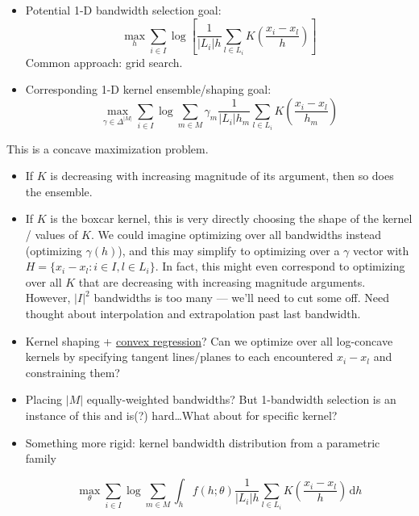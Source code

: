 \documentclass{article}
\begin{document}
\begin{itemize}
\item 
Potential 1-D bandwidth selection goal:
\[\max_h \sum_{i\in I} \log \left[ \frac{1}{\left|L_i\right| h}
    \sum_{l\in L_i} K\left(\frac{x_i-x_l}{h}\right) \right] \]
Common approach: grid search.
\item
Corresponding 1-D kernel ensemble/shaping goal:
\[\max_{\gamma\in\Delta^{\left|M\right|}} \sum_{i\in I} \log \sum_{m\in M} \gamma_m \frac{1}{\left|L_i\right| h_m}
    \sum_{l\in L_i} K\left(\frac{x_i-x_l}{h_m}\right) \]
\end{itemize}
This is a concave maximization problem.
%
\begin{itemize}
\item

  If $K$ is decreasing with increasing magnitude of its argument, then so does
  the ensemble.

\item

  If $K$ is the boxcar kernel, this is very directly choosing the shape of the
  kernel / values of $K$.
  We could imagine optimizing over all bandwidths instead (optimizing
  $\gamma(h)$), and this may simplify to optimizing over a $\gamma$ vector with
  $H=\{x_i-x_l:i\in I, l\in L_i\}$.
  In fact, this might even correspond to optimizing over all $K$ that are
  decreasing with increasing magnitude arguments.
  However, $\left|I\right|^2$ bandwidths is too many --- we'll need to cut some off.
  Need thought about interpolation and extrapolation past last bandwidth.

\item

  Kernel shaping +
  \href{http://www.stat.columbia.edu/~bodhi/Talks/NPCvxReg.pdf}{convex
    regression}? Can we optimize over all log-concave kernels by specifying
  tangent lines/planes to each encountered $x_i-x_l$ and constraining them?
\item

  Placing $\left|M\right|$ equally-weighted bandwidths? But 1-bandwidth
  selection is an instance of this and is(?) hard\ldots What about for specific
  kernel?

\item

  Something more rigid: kernel bandwidth distribution from a parametric family

  \[\max_\theta \sum_{i\in I} \log \sum_{m\in M} \int_h f(h;\theta) \frac{1}{\left|L_i\right| h}
    \sum_{l\in L_i} K\left(\frac{x_i-x_l}{h} \right) \,\mathrm{d}h \]


\end{itemize}
\end{document}
